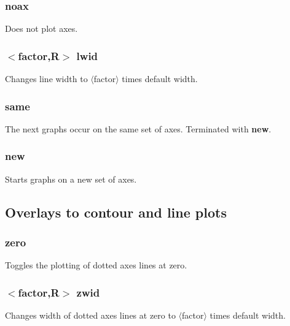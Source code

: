 \documentclass[a4paper,10pt]{report}
\begin{document}
\subsubsection{noax}\label{sec:noax}
Does not plot axes.

\subsubsection{$<$factor,{\bf R}$>$ lwid}\label{sec:lwid}
Changes line width to $\langle$factor$\rangle$ times default width.

\subsubsection{same}\label{sec:same}
The next graphs occur on the same set of axes.  Terminated with {\bf new}.

\subsubsection{new}\label{sec:new}
Starts graphs on a new set of axes.


\subsection{Overlays to contour and line plots}\label{sec:contouroverlays}

\subsubsection{zero}\label{sec:zero}
Toggles the plotting of dotted axes lines at zero.

\subsubsection{$<$factor,{\bf R}$>$ zwid}\label{sec:zwid}
Changes width of dotted axes lines at zero to $\langle$factor$\rangle$ times default width.
\end{document}
